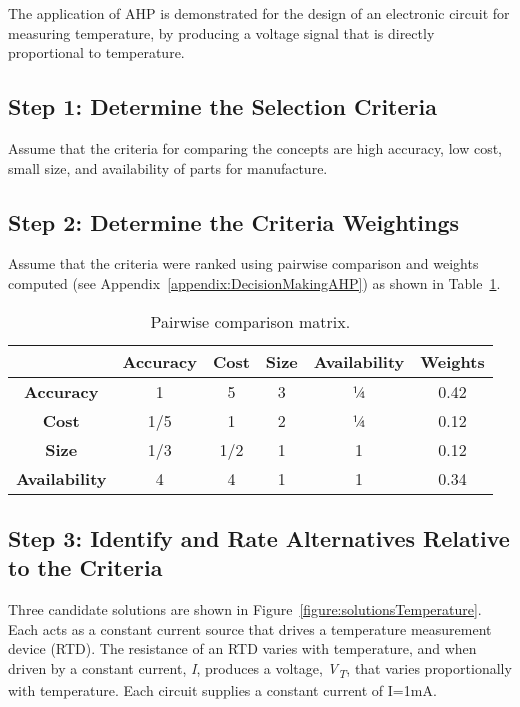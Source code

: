 The application of AHP is demonstrated for the design of an electronic
circuit for measuring temperature, by producing a voltage signal that is
directly proportional to temperature.

\subsection*{Step 1: Determine the Selection Criteria}
\label{subsection:step-1-determine-the-selection-criteria}

Assume that the criteria for comparing the concepts are high accuracy,
low cost, small size, and availability of parts for manufacture.

\subsection*{Step 2: Determine the Criteria Weightings}
\label{subsection:step-2-determine-the-criteria-weightings}

  Assume that the criteria were ranked using pairwise comparison and
  weights computed 
  (see Appendix~\ref{appendix:DecisionMakingAHP}) as shown in 
  Table~\ref{table:pairwiseCompMatrix}.

\begin{table}
\caption{Pairwise comparison matrix.}
\label{table:pairwiseCompMatrix}

\begin{tabular}{|c|c|c|c|c|c|}
\hline
  &
\textbf{Accuracy}&
\textbf{Cost}&
\textbf{Size}&
\textbf{Availability}& 
\textbf{Weights} \\ \hline

\textbf{Accuracy} & 1 & 5 & 3 & ¼ & 0.42 \\ \hline
\textbf{Cost} & 1/5 & 1 &  2  & ¼ & 0.12 \\ \hline
\textbf{Size} & 1/3 & 1/2 & 1 & 1 & 0.12 \\ \hline
\textbf{Availability} & 4 & 4 & 1  & 1 & 0.34 \\ \hline
\end{tabular}
\end{table}

\subsection*{Step 3: Identify and Rate Alternatives Relative to the Criteria}
\label{subsection:step-3-identify-and-rate-alternatives-relative-to-the-criteria}

Three candidate solutions are shown in 
Figure~\ref{figure:solutionsTemperature}. Each acts as a
constant current source that drives a temperature measurement device
(RTD). The resistance of an RTD varies with temperature, and when driven
by a constant cur­rent, \emph{I}, produces a voltage,
\emph{V\textsubscript{T}}, that varies proportionally with temperature.
Each circuit supplies a constant current of I=1mA.

